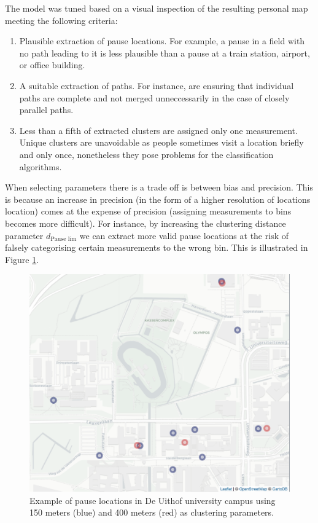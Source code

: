 \documentclass[man]{apa6}
\providecommand{\tightlist}{%
  \setlength{\itemsep}{0pt}\setlength{\parskip}{0pt}}
\theoremstyle{definition}
\theoremstyle{definition}
\theoremstyle{definition}
\theoremstyle{remark}
\begin{document}
The model was tuned based on a visual inspection of the resulting
personal map meeting the following criteria:

\begin{enumerate}
\def\labelenumi{\arabic{enumi}.}
\tightlist
\item
  Plausible extraction of pause locations. For example, a pause in a
  field with no path leading to it is less plausible than a pause at a
  train station, airport, or office building.
\item
  A suitable extraction of paths. For instance, are ensuring that
  individual paths are complete and not merged unneccessarily in the
  case of closely parallel paths.
\item
  Less than a fifth of extracted clusters are assigned only one
  measurement. Unique clusters are unavoidable as people sometimes visit
  a location briefly and only once, nonetheless they pose problems for
  the classification algorithms.
\end{enumerate}

When selecting parameters there is a trade off is between bias and
precision. This is because an increase in precision (in the form of a
higher resolution of locations location) comes at the expense of
precision (assigning measurements to bins becomes more difficult). For
instance, by increasing the clustering distance parameter
\(d_{\text{Pause lim}}\) we can extract more valid pause locations at
the risk of falsely categorising certain measurements to the wrong bin.
This is illustrated in Figure \ref{fig:pauseLocUithof1}.

\begin{figure}
\includegraphics[width=1\linewidth]{img/distanceParam} \caption{Example of pause locations in De Uithof university campus using 150 meters (blue) and 400 meters (red) as clustering parameters.}\label{fig:pauseLocUithof1}
\end{figure}
\end{document}
